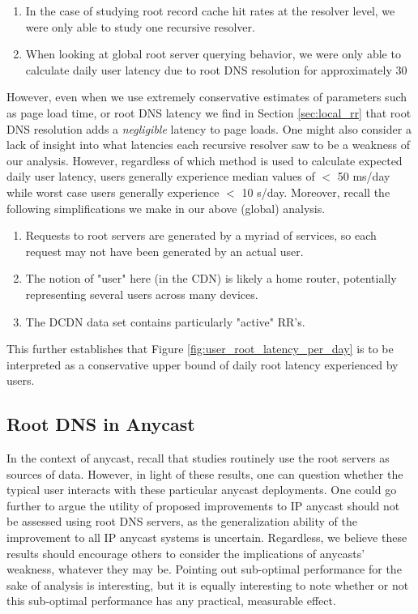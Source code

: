 \documentclass[sigconf,nonacm,10pt]{acmart}
\begin{document}
\begin{enumerate}
        \item In the case of studying root record cache hit rates at the resolver level, we were only able to study one recursive resolver.
        \item When looking at global root server querying behavior, we were only able to calculate daily user latency due to root DNS resolution for approximately 30%
\end{enumerate}

However, even when we use extremely conservative estimates of parameters
such as page load time, or root DNS latency we find in Section
\ref{sec:local_rr} that root DNS resolution adds a \textit{negligible}
latency to page loads. \break
One might also consider a lack of insight into what latencies each
recursive resolver saw to be a weakness of our analysis. However,
regardless of which method is used to calculate expected daily user
latency, users generally experience median values of \(<\) 50 ms/day
while worst case users generally experience \(<\) 10 s/day. Moreover,
recall the following simplifications we make in our above (global)
analysis.

\begin{enumerate}
        \item Requests to root servers are generated by a myriad of services, so each request may not have been generated by an actual user.
        \item The notion of "user" here (in the CDN) is likely a home router, potentially representing several users across many devices.
        \item The DCDN data set contains particularly "active" RR's.
\end{enumerate}

This further establishes that Figure \ref{fig:user_root_latency_per_day}
is to be interpreted as a conservative upper bound of daily root latency
experienced by users. \break \break

\subsection{Root DNS in Anycast}\label{root-dns-in-anycast}

In the context of anycast, recall that studies routinely use the root
servers as sources of data. However, in light of these results, one can
question whether the typical user interacts with these particular
anycast deployments. One could go further to argue the utility of
proposed improvements to IP anycast should not be assessed using root
DNS servers, as the generalization ability of the improvement to all IP
anycast systems is uncertain. \break
Regardless, we believe these results should encourage others to consider
the implications of anycasts' weakness, whatever they may be. Pointing
out sub-optimal performance for the sake of analysis is interesting, but
it is equally interesting to note whether or not this sub-optimal
performance has any practical, measurable effect.
\end{document}
